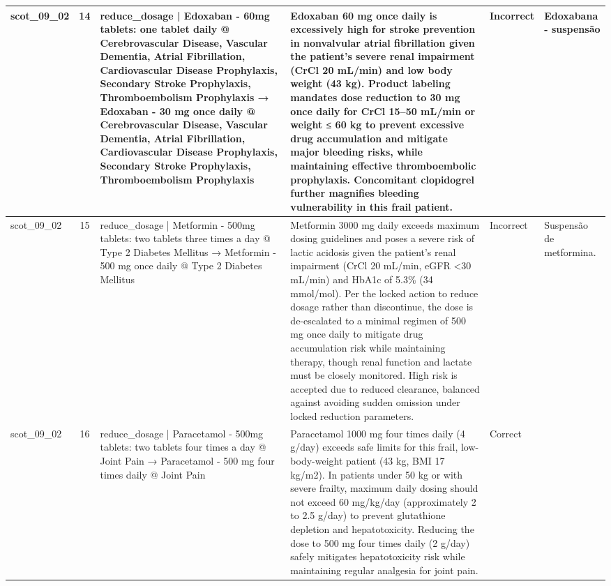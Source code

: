 \begin{longtable}{|p{1.45cm}|c|p{3.3cm}|p{6.5cm}|p{1.55cm}|p{2.3cm}|}
\hline
scot\_09\_02 & 14 & reduce\_dosage | Edoxaban - 60mg tablets: one tablet daily @ Cerebrovascular Disease, Vascular Dementia, Atrial Fibrillation, Cardiovascular Disease Prophylaxis, Secondary Stroke Prophylaxis, Thromboembolism Prophylaxis → Edoxaban - 30 mg once daily @ Cerebrovascular Disease, Vascular Dementia, Atrial Fibrillation, Cardiovascular Disease Prophylaxis, Secondary Stroke Prophylaxis, Thromboembolism Prophylaxis & Edoxaban 60 mg once daily is excessively high for stroke prevention in nonvalvular atrial fibrillation given the patient's severe renal impairment (CrCl 20 mL/min) and low body weight (43 kg). Product labeling mandates dose reduction to 30 mg once daily for CrCl 15–50 mL/min or weight ≤ 60 kg to prevent excessive drug accumulation and mitigate major bleeding risks, while maintaining effective thromboembolic prophylaxis. Concomitant clopidogrel further magnifies bleeding vulnerability in this frail patient. & Incorrect & Edoxabana - suspensão \\
\hline
scot\_09\_02 & 15 & reduce\_dosage | Metformin - 500mg tablets: two tablets three times a day @ Type 2 Diabetes Mellitus → Metformin - 500 mg once daily @ Type 2 Diabetes Mellitus & Metformin 3000 mg daily exceeds maximum dosing guidelines and poses a severe risk of lactic acidosis given the patient's renal impairment (CrCl 20 mL/min, eGFR <30 mL/min) and HbA1c of 5.3\% (34 mmol/mol). Per the locked action to reduce dosage rather than discontinue, the dose is de-escalated to a minimal regimen of 500 mg once daily to mitigate drug accumulation risk while maintaining therapy, though renal function and lactate must be closely monitored. High risk is accepted due to reduced clearance, balanced against avoiding sudden omission under locked reduction parameters. & Incorrect & Suspensão de metformina. \\
\hline
scot\_09\_02 & 16 & reduce\_dosage | Paracetamol - 500mg tablets: two tablets four times a day @ Joint Pain → Paracetamol - 500 mg four times daily @ Joint Pain & Paracetamol 1000 mg four times daily (4 g/day) exceeds safe limits for this frail, low-body-weight patient (43 kg, BMI 17 kg/m2). In patients under 50 kg or with severe frailty, maximum daily dosing should not exceed 60 mg/kg/day (approximately 2 to 2.5 g/day) to prevent glutathione depletion and hepatotoxicity. Reducing the dose to 500 mg four times daily (2 g/day) safely mitigates hepatotoxicity risk while maintaining regular analgesia for joint pain. & Correct &  \\
\hline

\end{longtable}
